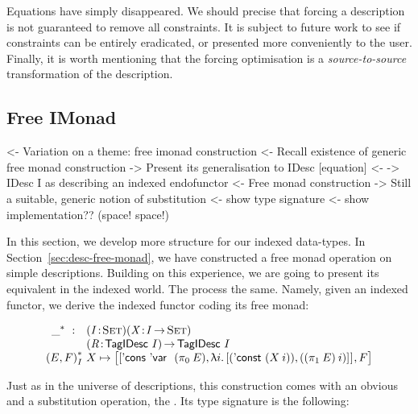Equations have simply disappeared. We should precise that forcing a
description is not guaranteed to remove all constraints. It is subject
to future work to see if constraints can be entirely eradicated, or
presented more conveniently to the user. Finally, it is worth
mentioning that the forcing optimisation is a \emph{source-to-source}
transformation of the description.

\subsection{Free IMonad}

\begin{wstructure}
<- Variation on a theme: free imonad construction
    <- Recall existence of generic free monad construction
    -> Present its generalisation to IDesc [equation]
        <- \I -> IDesc I as describing an indexed endofunctor
        <- Free monad construction
    -> Still a suitable, generic notion of substitution
        <- show type signature
        <- show implementation?? (space! space!)
\end{wstructure}

In this section, we develop more structure for our indexed
data-types. In Section~\ref{sec:desc-free-monad}, we have constructed
a free monad operation on simple descriptions. Building on this
experience, we are going to present its equivalent in the indexed
world. The process the same. Namely, given an indexed functor, we
derive the indexed functor coding its free monad:

\[\stk{
\begin{array}{ll}
\FreeIMonad{\_}{} : & \PITEL{\V{I}}{\Set}
                      \PITEL{\V{X}}{\V{I} \To \Set} \\
                    & \PITEL{\V{R}}{\TagIDesc{I}} \To
                      \TagIDesc{I}
\end{array} \\
\FreeIMonad{(E,F)}{I}{X} \mapsto
    \pair{\pair{\ListCons{\DVar{}}{(\fst{E})}} 
               {\LAM{i}
                \pair{(\DConst{(X\: i)})}
                     {((\snd{E})\: i)}{}}{}}
         {F}{}
}\]

Just as in the universe of descriptions, this construction comes with
an obvious \return and a substitution operation, the \bind. Its type
signature is the following:

\newcommand{\substI}{\F{substI}}

